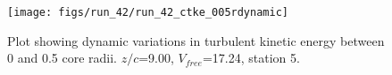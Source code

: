 \begin{figure}[H]
\centering
\texttt{[image: figs/run\_42/run\_42\_ctke\_005rdynamic]}
\caption{Plot showing dynamic variations in turbulent kinetic energy between 0 and 0.5 core radii. $z/c$=9.00, $V_{free}$=17.24, station 5.}
\label{fig:run_42_ctke_005rdynamic}
\end{figure}


